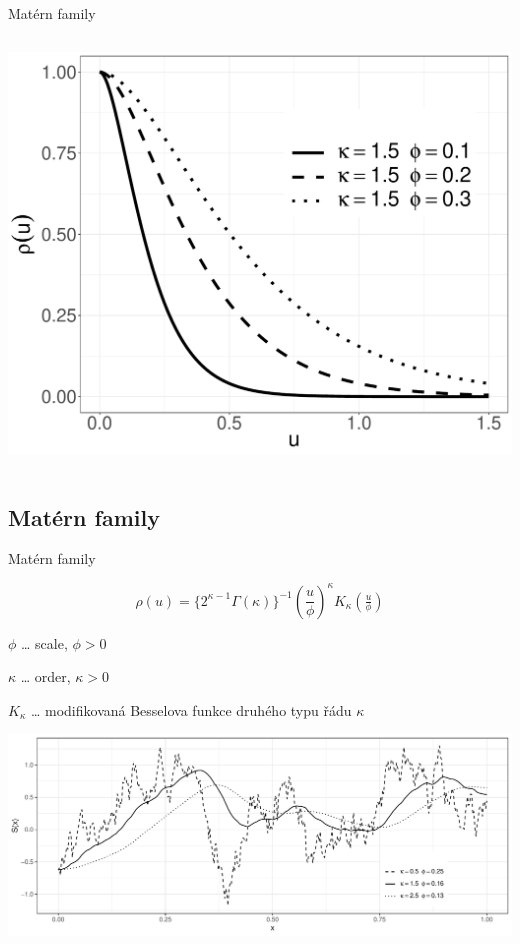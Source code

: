 \documentclass[
  ignorenonframetext,
]{beamer}
\begin{document}
\begin{frame}{Matérn family}
\begin{columns}[T]
\begin{column}{0.5\textwidth}
\includegraphics{Lecture_1_files/figure-beamer/unnamed-chunk-24-1.pdf}
\end{column}
\end{columns}
\end{frame}

\hypertarget{matuxe9rn-family-1}{%
\subsection{Matérn family}\label{matuxe9rn-family-1}}

\begin{frame}{Matérn family}
\large

\[\rho(u)=\{2^{\kappa-1}\Gamma(\kappa)\}^{-1}\left(\frac{u}{\phi}\right)^\kappa K_\kappa\left(\tfrac{u}{\phi}\right)\]

\small

\(\phi\) \ldots{} scale, \(\phi>0\)

\(\kappa\) \ldots{} order, \(\kappa>0\)

\(K_\kappa\) \ldots{} modifikovaná Besselova funkce druhého typu řádu
\(\kappa\)

\includegraphics{Lecture_1_files/figure-beamer/unnamed-chunk-25-1.pdf}
\end{frame}
\end{document}
